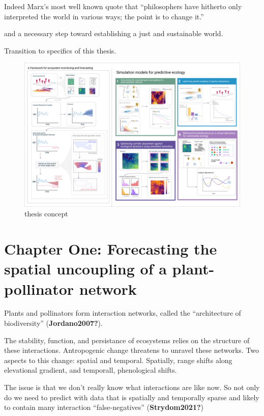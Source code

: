 \documentclass[11pt]{article}
\makeatletter
\def\maxwidth{\ifdim\Gin@nat@width>\linewidth\linewidth
\else\Gin@nat@width\fi}
\let\Oldincludegraphics\includegraphics
\renewcommand{\includegraphics}[1]{\Oldincludegraphics[width=\maxwidth]{#1}}
\makeatother
\begin{document}
Indeed Marx's most well known quote that ``philosophers have hitherto
only interpreted the world in various ways; the point is to change it.''

and a necessary step toward establishing a just and sustainable world.

Transition to specifics of this thesis.

\begin{figure}
\centering
\includegraphics{./figures/thesisconcept.png}
\caption{thesis concept}
\end{figure}

\hypertarget{chapter-one-forecasting-the-spatial-uncoupling-of-a-plant-pollinator-network}{%
\section{Chapter One: Forecasting the spatial uncoupling of a
plant-pollinator
network}\label{chapter-one-forecasting-the-spatial-uncoupling-of-a-plant-pollinator-network}}

Plants and pollinators form interaction networks, called the
``architecture of biodiversity'' (\textbf{Jordano2007?}).

The stability, function, and persistance of ecosystems relies on the
structure of these interactions. Antropogenic change threatens to
unravel these networks. Two aspects to this change: spatial and
temporal. Spatially, range shifts along elevational gradient, and
temporall, phenological shifts.

The issue is that we don't really know what interactions are like now.
So not only do we need to predict with data that is spatially and
temporally sparse and likely to contain many interaction
``false-negatives'' (\textbf{Strydom2021?})
\end{document}
